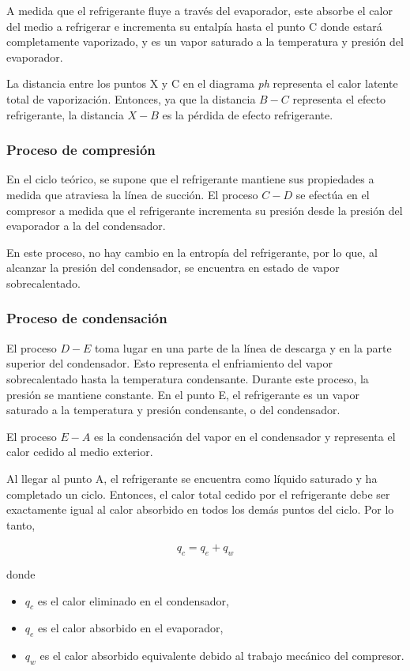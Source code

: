 			A medida que el refrigerante fluye a través del evaporador, este absorbe el calor del medio a refrigerar e incrementa su entalpía hasta el punto C donde estará completamente vaporizado, y es un vapor saturado a la temperatura y presión del evaporador.
			
			La distancia entre los puntos X y C en el diagrama \textit{ph} representa el calor latente total de vaporización. Entonces, ya que la distancia $B-C$ representa el efecto refrigerante, la distancia $X-B$ es la pérdida de efecto refrigerante.
				    
			\subsubsection{Proceso de compresión} En el ciclo teórico, se supone que el refrigerante mantiene sus propiedades a medida que atraviesa la línea de succión. El proceso $C-D$ se efectúa en el compresor a medida que el refrigerante incrementa su presión desde la presión del evaporador a la del condensador.
			
			En este proceso, no hay cambio en la entropía del refrigerante, por lo que, al alcanzar la presión del condensador, se encuentra en estado de vapor sobrecalentado.
				  
			\subsubsection{Proceso de condensación} El proceso $D-E$ toma lugar en una parte de la línea de descarga y en la parte superior del condensador. Esto representa el enfriamiento del vapor sobrecalentado hasta la temperatura condensante. Durante este proceso, la presión se mantiene constante. En el punto E, el refrigerante es un vapor saturado a la temperatura y presión condensante, o del condensador.
			
			El proceso $E-A$ es la condensación del vapor en el condensador y representa el calor cedido al medio exterior. 
			
			Al llegar al punto A, el refrigerante se encuentra como líquido saturado y ha completado un ciclo. Entonces, el calor total cedido por el refrigerante debe ser exactamente igual al calor absorbido en todos los demás puntos del ciclo. Por lo tanto,
			
			\begin{equation*}
				q_c = q_e + q_w
			\end{equation*}
			
			donde
			\begin{itemize}
				\item $q_c$ es el calor eliminado en el condensador,
				\item $q_e$ es el calor absorbido en el evaporador,
				\item $q_w$ es el calor absorbido equivalente debido al trabajo mecánico del compresor.
			\end{itemize}
			
